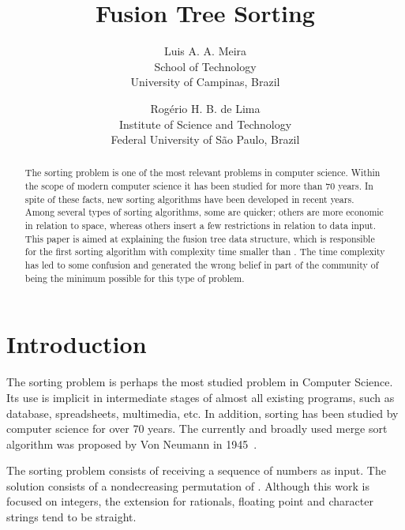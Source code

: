 \documentclass[11pt]{article}
\begin{document}
\title{Fusion Tree Sorting}




\author{Luis A. A. Meira \\ \small School of Technology  \\ \small University of Campinas, Brazil \and Rogério H. B. de Lima \\ \small Institute of Science and Technology \\ \small Federal University of S\~{a}o  Paulo, Brazil }

\maketitle




\begin{abstract}
 The sorting problem is one of the most relevant problems in computer science. Within the scope of modern computer science it has been studied for more than 70 years. In spite of these facts, new sorting algorithms have been developed in recent years. Among several types of sorting algorithms, some are quicker; others are more economic in relation to space, whereas others insert a few restrictions in relation to data input. This paper is aimed at explaining the fusion tree data structure, which is responsible for the first sorting algorithm with complexity time smaller than . The  time complexity has led to some confusion and generated the wrong belief in part of the community of being the minimum possible for this type of problem.
\end{abstract}

\section{Introduction}



The sorting problem is perhaps the most studied problem in Computer Science. Its use is implicit in intermediate stages of almost all existing programs, such as database, spreadsheets, multimedia, etc. In addition, sorting has been studied by computer science for over 70 years. The currently and broadly used merge sort algorithm was proposed by Von Neumann in 1945~\cite{cormen}.
 
 The sorting problem consists of receiving a sequence  of  numbers as input. The solution consists of a nondecreasing permutation   of . Although this work is focused on integers, the extension for rationals, floating point and character strings tend to be straight.
 
\end{document}
